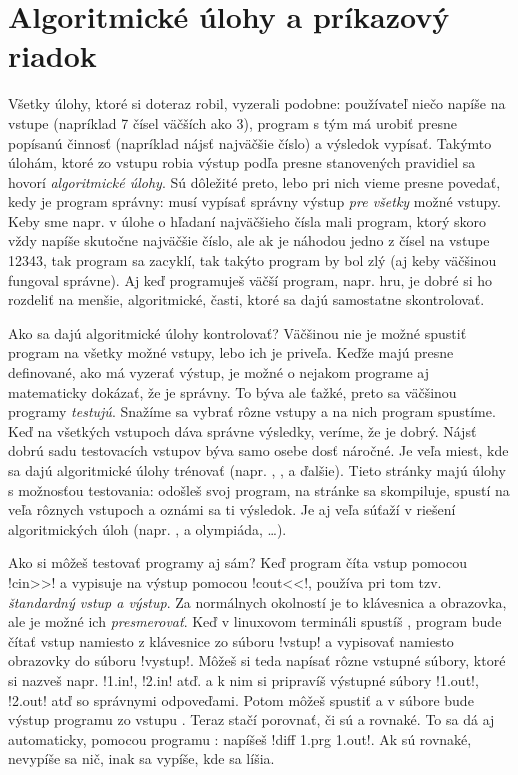 \chapter{Algoritmické úlohy a príkazový riadok}

Všetky úlohy, ktoré si doteraz robil, vyzerali podobne: používateľ niečo napíše na vstupe
(napríklad 7 čísel väčších ako 3),
program s tým má urobiť presne popísanú činnosť (napríklad nájsť najväčšie číslo) a výsledok 
vypísať. Takýmto úlohám, ktoré zo vstupu robia výstup podľa presne stanovených pravidiel
sa hovorí {\em algoritmické úlohy}. Sú dôležité preto, lebo pri nich vieme presne
povedať, kedy je program správny: musí vypísať správny výstup {\em pre všetky} možné vstupy.
Keby sme napr. v úlohe o hľadaní najväčšieho čísla mali program, ktorý skoro vždy
napíše skutočne najväčšie číslo, ale ak je náhodou jedno z čísel na vstupe 12343, 
tak program sa zacyklí,
tak takýto program by bol zlý (aj keby väčšinou fungoval správne).
Aj keď programuješ väčší program, napr. hru, je dobré si ho rozdeliť na menšie, algoritmické,
časti, ktoré sa dajú samostatne skontrolovať. 

Ako sa dajú algoritmické úlohy kontrolovať? Väčšinou nie je možné spustiť program
na všetky možné vstupy, lebo ich je priveľa. Keďže majú presne definované, ako má vyzerať
výstup, je možné o nejakom programe aj matematicky dokázať, že je správny. To býva ale
ťažké, preto sa väčšinou programy {\em testujú}. Snažíme sa vybrať rôzne vstupy a na nich
program spustíme. Keď na všetkých vstupoch dáva správne výsledky, veríme, že je dobrý.
Nájsť dobrú sadu testovacích vstupov býva samo osebe dosť náročné. Je veľa miest,
kde sa dajú algoritmické úlohy trénovať (napr. 
, ,
a ďalšie). Tieto stránky majú úlohy s možnosťou testovania: odošleš svoj program, na
stránke sa skompiluje, spustí na veľa rôznych vstupoch a oznámi sa ti výsledok. Je aj
veľa súťaží v riešení algoritmických úloh (napr. 
,  a 
 olympiáda, \ldots).

Ako si môžeš testovať programy aj sám? Keď program číta vstup pomocou \prg!cin>>! a 
vypisuje na výstup pomocou \prg!cout<<!, používa pri tom tzv. {\em štandardný vstup a výstup}.
Za normálnych okolností je to klávesnica a obrazovka, ale je možné ich 
{\em presmerovať}. Keď v linuxovom termináli spustíš 
, program bude čítať vstup namiesto z klávesnice 
zo súboru \prg!vstup! a vypisovať namiesto obrazovky do súboru \prg!vystup!. Môžeš
si teda napísať rôzne vstupné súbory, ktoré si nazveš napr. \prg!1.in!, \prg!2.in!
atď. a k nim si pripravíš výstupné súbory \prg!1.out!, \prg!2.out! atď so správnymi 
odpoveďami.
Potom môžeš spustiť  a v súbore  bude výstup 
programu zo vstupu . Teraz stačí porovnať, či sú  a 
rovnaké. To sa dá aj automaticky, pomocou programu : napíšeš 
\prg!diff 1.prg 1.out!. 
Ak sú rovnaké, 
nevypíše sa nič, inak sa vypíše, kde sa líšia.

